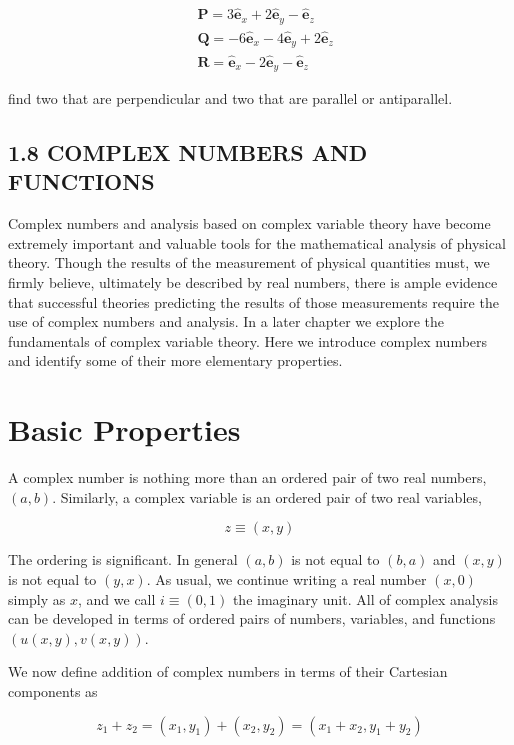 \documentclass[10pt]{article}
\begin{document}
$$
\begin{aligned}
& \mathbf{P}=3 \hat{\mathbf{e}}_{x}+2 \hat{\mathbf{e}}_{y}-\hat{\mathbf{e}}_{z} \\
& \mathbf{Q}=-6 \hat{\mathbf{e}}_{x}-4 \hat{\mathbf{e}}_{y}+2 \hat{\mathbf{e}}_{z} \\
& \mathbf{R}=\hat{\mathbf{e}}_{x}-2 \hat{\mathbf{e}}_{y}-\hat{\mathbf{e}}_{z}
\end{aligned}
$$

find two that are perpendicular and two that are parallel or antiparallel.

\subsection*{1.8 COMPLEX NUMBERS AND FUNCTIONS}
Complex numbers and analysis based on complex variable theory have become extremely important and valuable tools for the mathematical analysis of physical theory. Though the results of the measurement of physical quantities must, we firmly believe, ultimately be described by real numbers, there is ample evidence that successful theories predicting the results of those measurements require the use of complex numbers and analysis. In a later chapter we explore the fundamentals of complex variable theory. Here we introduce complex numbers and identify some of their more elementary properties.

\section*{Basic Properties}
A complex number is nothing more than an ordered pair of two real numbers, $(a, b)$. Similarly, a complex variable is an ordered pair of two real variables,


\begin{equation*}
z \equiv(x, y) \tag{1.115}
\end{equation*}


The ordering is significant. In general $(a, b)$ is not equal to $(b, a)$ and $(x, y)$ is not equal to $(y, x)$. As usual, we continue writing a real number $(x, 0)$ simply as $x$, and we call $i \equiv(0,1)$ the imaginary unit. All of complex analysis can be developed in terms of ordered pairs of numbers, variables, and functions $(u(x, y), v(x, y))$.

We now define addition of complex numbers in terms of their Cartesian components as


\begin{equation*}
z_{1}+z_{2}=\left(x_{1}, y_{1}\right)+\left(x_{2}, y_{2}\right)=\left(x_{1}+x_{2}, y_{1}+y_{2}\right) \tag{1.116}
\end{equation*}
\end{document}
